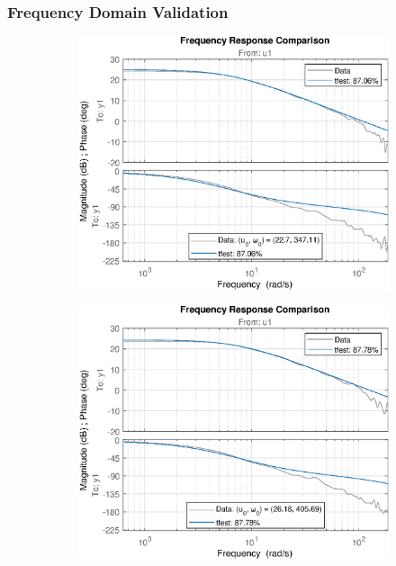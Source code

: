 
\subsubsection{Frequency Domain Validation}
\begin{figure}[H]
    \begin{minipage}{0.32\textwidth}
       \begin{figure}[H]
            \includegraphics[width = \textwidth]{./figs/small_perturbation/freq_Compare_1250.eps}
       \end{figure}
    \end{minipage}
    \begin{minipage}{0.32\textwidth}
       \begin{figure}[H]
            \includegraphics[width = \textwidth]{./figs/small_perturbation/freq_Compare_1300.eps}

\end{figure}
\end{minipage}
\end{figure}
